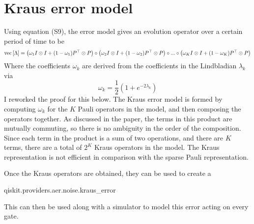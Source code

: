 \documentclass[11pt]{article}
\newcommand{\vectorize}[1]{\operatorname{vec}\left[#1\right]}
\begin{document}
\section*{Kraus error model}
Using equation (S9), the error model gives an evolution operator over a certain period of time to be
$$
\vectorize{\Lambda} = \qty(\omega_1 I \otimes I+(1-\omega_1)P^\top \otimes P) \circ\qty(\omega_2 I \otimes I+(1-\omega_2)P^\top \otimes P) \circ ... \circ \qty(\omega_K I \otimes I+(1-\omega_K)P^\top \otimes P)
$$
Where the coefficients $\omega_k$ are derived from the coefficients in the Lindbladian $\lambda_k$ via
$$
\omega_k = \frac{1}{2}(1+e^{-2\lambda_k})
$$
I reworked the proof for this below. The Kraus error model is formed by computing $\omega_k$ for the $K$ Pauli operators in the model, and then composing the operators together. As discussed in the paper, the terms in this product are mutually commuting, so there is no ambiguity in the order of the composition. Since each term in the product is a sum of two operations, and there are $K$ terms, there are a total of $2^K$ Kraus operators in the model. The Kraus representation is not efficient in comparison with the sparse Pauli representation.
\par Once the Kraus operators are obtained, they can be used to create a 
\begin{pyverbatim}
    qiskit.providers.aer.noise.kraus_error
\end{pyverbatim}
This can then be used along with a simulator to model this error acting on every gate. 
\end{document}
